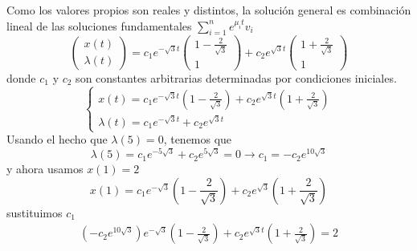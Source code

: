 \documentclass{uofa-eng-assignment}
\begin{document}
\begin{enumerate}
Como los valores propios son reales y distintos, la solución general es combinación lineal de las soluciones fundamentales  $\sum _{i=1}^n e^{\mu_i t}v_i $
\begin{equation*}
\begin{pmatrix}
x(t) \\
\lambda(t)
\end{pmatrix}
= c_1 e^{-\sqrt{3}t}   \begin{pmatrix}
1-\frac{2}{\sqrt{3}} \\1
\end{pmatrix}  + c_2 e^{\sqrt{3}t} \begin{pmatrix}
1+\frac{2}{\sqrt{3}} \\1
\end{pmatrix}
\end{equation*}
donde \( c_1 \) y \( c_2 \) son constantes arbitrarias determinadas por condiciones iniciales.
\[
\begin{cases}
x(t)=c_1 e^{-\sqrt{3}t}\left(1-\frac{2}{\sqrt{3}}\right)
+ c_2 e^{\sqrt{3}t}\left(1+\frac{2}{\sqrt{3}}\right) \\[6pt]
\lambda(t)=c_1 e^{-\sqrt{3}t}+c_2 e^{\sqrt{3}t}
\end{cases}
\]
Usando el hecho que $\lambda(5)=0$, tenemos que
\[
\lambda(5)=c_1 e^{-5\sqrt{3}}+c_2 e^{5\sqrt{3}}=0 \to c_1=-c_2 e^{10\sqrt{3}}
\]
y ahora usamos $x(1)=2$
\[
x(1)=c_1 e^{-\sqrt{3}}\left(1-\frac{2}{\sqrt{3}}\right)
+ c_2 e^{\sqrt{3}}\left(1+\frac{2}{\sqrt{3}}\right)
\]
sustituimos $c_1$
\begin{align*}
    (-c_2 e^{10\sqrt{3}})e^{-\sqrt{3}}\left(1-\frac{2}{\sqrt{3}}\right)
+ c_2 e^{\sqrt{3}t}\left(1+\frac{2}{\sqrt{3}}\right) =2
\end{align*}


\end{enumerate}
\end{document}
